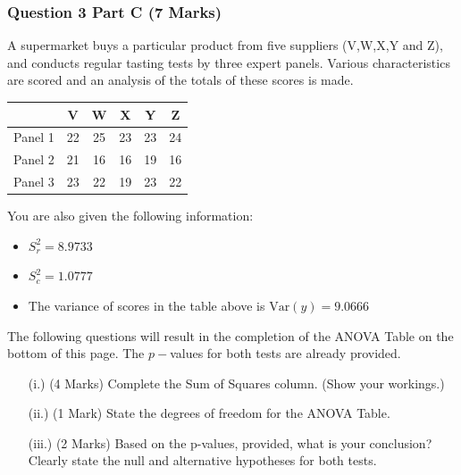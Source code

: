 \documentclass[a4paper,12pt]{article}
\begin{document}
	\subsubsection*{Question 3 Part C (7 Marks)}
	\noindent A supermarket buys a particular product from five suppliers (V,W,X,Y and Z), and conducts regular tasting tests by three expert panels.
	Various characteristics are scored and an analysis of the totals of these scores is made. 
	
	\begin{center}
		\begin{tabular}{|c|c|c|c|c|c|}\hline 
			&	V  & W  & X & Y & Z \\ \hline
			\hline  
			
			Panel 1&   22 &  25 &  23 &  23 &  24 \\ \hline
			Panel 2&   21 &  16 &  16 &  19 &  16 \\ \hline
			Panel 3&   23 &  22 &  19 &  23 &  22 \\ \hline
			
			\hline 
		\end{tabular} 
	\end{center}
	
	\noindent You are also given the following information:
	\begin{itemize}
		\item $S^2_r = 8.9733$
		\item $S^2_c = 1.0777$
		\item The variance of scores in the table above is $\mbox{Var}(y) = 9.0666$
	\end{itemize}
	\bigskip 
	\noindent The following questions will result in the completion of the ANOVA Table on the bottom of this page. The $p-$values for both tests are already provided.
	\begin{itemize}
		\item[(i.)](4 Marks) Complete the Sum of Squares column. (Show your workings.)
		\item[(ii.)] (1 Mark) State the degrees of freedom for the ANOVA Table.
		\item[(iii.)] (2 Marks) Based on the p-values, provided, what is your conclusion? Clearly state the null and alternative hypotheses for both tests.
	\end{itemize}
	
\end{document}
